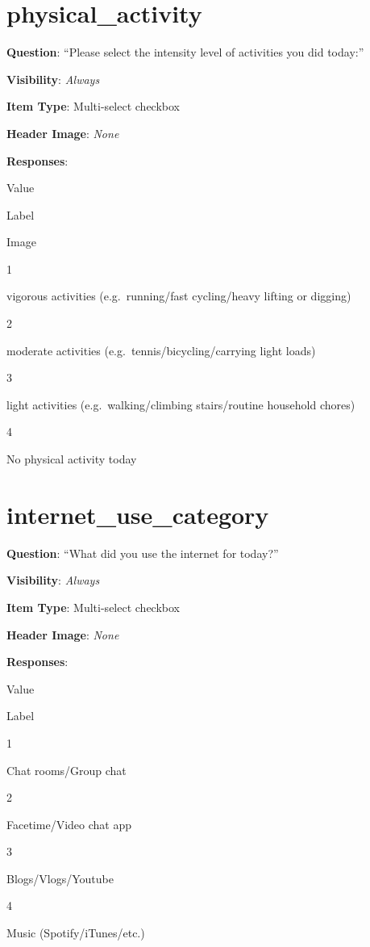 \documentclass[]{book}
\begin{document}
\hypertarget{physical_activity}{%
\section{physical\_activity}\label{physical_activity}}

\textbf{Question}: ``Please select the intensity level of activities you did today:''

\textbf{Visibility}: \emph{Always}

\textbf{Item Type}: Multi-select checkbox

\textbf{Header Image}: \emph{None}

\textbf{Responses}:

Value

Label

Image

1

vigorous activities (e.g.~running/fast cycling/heavy lifting or digging)

2

moderate activities (e.g.~tennis/bicycling/carrying light loads)

3

light activities (e.g.~walking/climbing stairs/routine household chores)

4

No physical activity today

\hypertarget{internet_use_category}{%
\section{internet\_use\_category}\label{internet_use_category}}

\textbf{Question}: ``What did you use the internet for today?''

\textbf{Visibility}: \emph{Always}

\textbf{Item Type}: Multi-select checkbox

\textbf{Header Image}: \emph{None}

\textbf{Responses}:

Value

Label

1

Chat rooms/Group chat

2

Facetime/Video chat app

3

Blogs/Vlogs/Youtube

4

Music (Spotify/iTunes/etc.)
\end{document}
